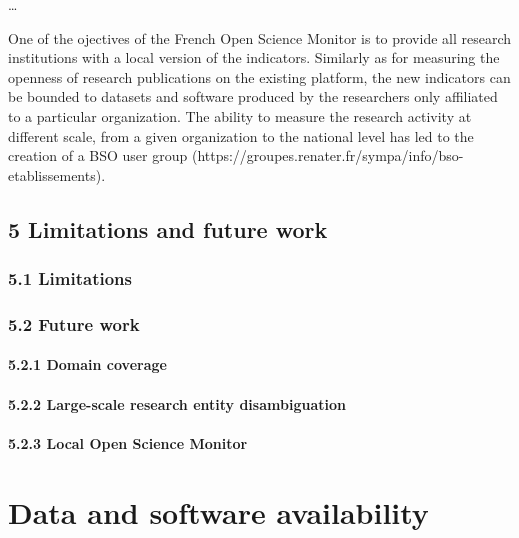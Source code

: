 \documentclass[
]{article}
\begin{document}
\ldots{}

One of the ojectives of the French Open Science Monitor is to provide
all research institutions with a local version of the indicators.
Similarly as for measuring the openness of research publications on the
existing platform, the new indicators can be bounded to datasets and
software produced by the researchers only affiliated to a particular
organization. The ability to measure the research activity at different
scale, from a given organization to the national level has led to the
creation of a BSO user group
(https://groupes.renater.fr/sympa/info/bso-etablissements).

\hypertarget{limitations-and-future-work}{%
\subsection{5 Limitations and future
work}\label{limitations-and-future-work}}

\hypertarget{limitations}{%
\subsubsection{5.1 Limitations}\label{limitations}}

\hypertarget{future-work}{%
\subsubsection{5.2 Future work}\label{future-work}}

\hypertarget{domain-coverage}{%
\paragraph{5.2.1 Domain coverage}\label{domain-coverage}}

\hypertarget{large-scale-research-entity-disambiguation}{%
\paragraph{5.2.2 Large-scale research entity
disambiguation}\label{large-scale-research-entity-disambiguation}}

\hypertarget{local-open-science-monitor}{%
\paragraph{5.2.3 Local Open Science
Monitor}\label{local-open-science-monitor}}

\hypertarget{data-and-software-availability}{%
\section{Data and software
availability}\label{data-and-software-availability}}
\end{document}
